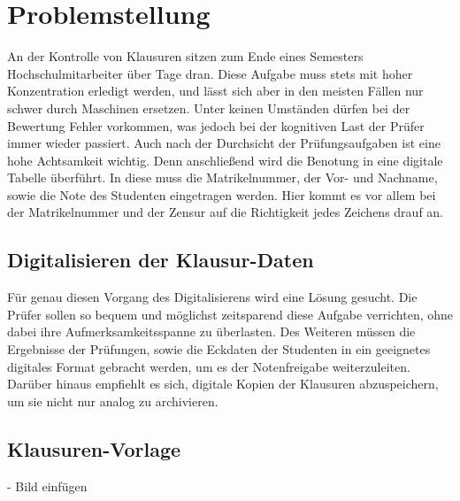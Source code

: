 \documentclass[nomenclature, onesided, 150]{HSMW-Thesis}
\begin{document}

\chapter{Problemstellung} 
	An der Kontrolle von Klausuren sitzen zum Ende eines Semesters Hochschulmitarbeiter über Tage dran. Diese Aufgabe muss stets mit hoher Konzentration erledigt werden, und lässt sich aber in den meisten Fällen nur schwer durch Maschinen ersetzen. Unter keinen Umständen dürfen bei der Bewertung Fehler vorkommen, was jedoch bei der kognitiven Last der Prüfer immer wieder passiert. Auch nach der Durchsicht der Prüfungsaufgaben ist eine hohe Achtsamkeit wichtig. Denn anschließend wird die Benotung in eine digitale Tabelle überführt. In diese muss die Matrikelnummer, der Vor- und Nachname, sowie die Note des Studenten eingetragen werden. Hier kommt es vor allem bei der Matrikelnummer und der Zensur auf die Richtigkeit jedes Zeichens drauf an. 
	
	\section{Digitalisieren der Klausur-Daten}
	Für genau diesen Vorgang des Digitalisierens wird eine Lösung gesucht. Die Prüfer sollen so bequem und möglichst zeitsparend diese Aufgabe verrichten, ohne dabei ihre Aufmerksamkeitsspanne zu überlasten. Des Weiteren müssen die Ergebnisse der Prüfungen, sowie die Eckdaten der Studenten in ein geeignetes digitales Format gebracht werden, um es der Notenfreigabe weiterzuleiten. Darüber hinaus empfiehlt es sich, digitale Kopien der Klausuren abzuspeichern, um sie nicht nur analog zu archivieren.
	
	\section{Klausuren-Vorlage}
	
	- Bild einfügen
	
\end{document}
